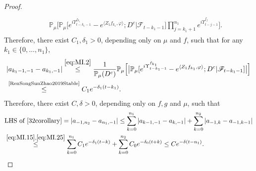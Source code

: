 \documentclass[12pt,a4paper]{amsart}
\theoremstyle{plain}
\theoremstyle{definition}
\numberwithin{equation}{section}
\begin{document}
\begin{proof}
\begin{align}
\begin{multlined}
	\\ \qquad \mathbb{P}_{\mu}\Big[ \mathbb P_\mu\big[e^{i\Upsilon_{t-k_1-1}^{f_{k_1}}} -e^{\langle Z_1 f_{k_1}, \varphi\rangle}  ; D^c \big| \mathscr F_{t-k_1 - 1}\big] \prod_{j=k_1+1}^{n_1} e^{i\Upsilon_{t-j-1}^{f_j}} \Big] .
	\end{multlined}
	\end{align}
	Therefore,  there exist $C_1,\delta_1 >0$, depending only on $\mu$ and $f$,
	such that for any $k_1 \in \{0,\dots,n_1\}$,
\begin{align}
    &| a_{k_1-1,-1} - a_{k_1,-1}|
    \overset{\eqref{eq:MI.2}}\leq \frac{1}{\mathbb{P}_{\mu}(D^c)}\mathbb{P}_{\mu}\Big[\big|\mathbb P_\mu[e^{i\Upsilon^{f_{k_1}}_{t-k_1-1}}-e^{\langle Z_1f_{k_1}, \varphi\rangle}; D^c|\mathscr F_{t-k_1-1}]\big|\Big]
    \\&\label{eq:MI.25}\overset{\text{\cite[Proposition 3.5]{RenSongSunZhao2019Stable}}}\leq C_1 e^{-\delta_1 (t-k_1)}.
\end{align}
  Therefore, there exist $C,\delta >0$, depending only on $f,g$ and $\mu$, such that
  \begin{align}
    &\text{LHS of \eqref{32corollary}}
    = \left|a_{-1,n_2}-a_{n_1,-1}\right|
      \leq \sum_{k=0}^{n_1}\left|a_{k-1,-1}-a_{k,-1}\right|+\sum_{k=0}^{n_2}\left|a_{-1,k}-a_{-1,k-1}\right|\\
     & \overset{\eqref{eq:MI.15},\eqref{eq:MI.25}}\leq \sum_{k=0}^{n_1} C_1 e^{-\delta_1 (t-k)}+\sum_{k=0}^{n_2} C_0 e^{-\delta_0 (t+k)}
      \leq C e^{- \delta (t-n_1)}.
      \qedhere
  \end{align}
\end{proof}
\end{document}
